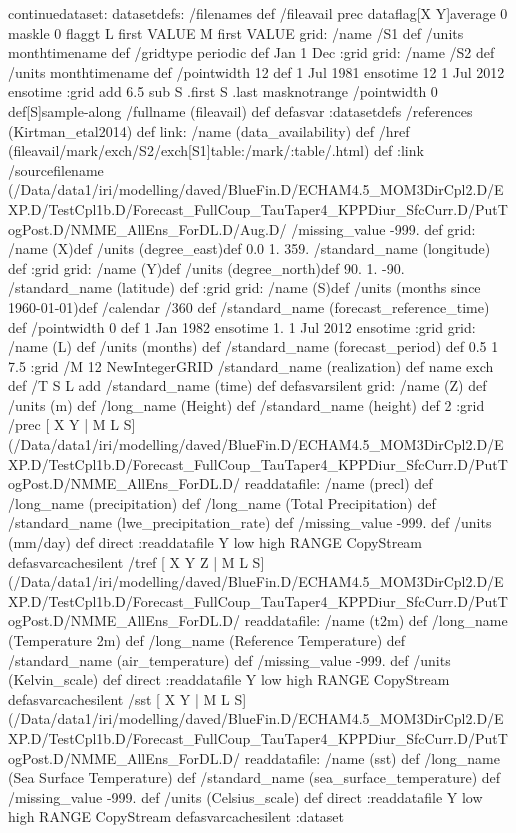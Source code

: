 \begin{ingrid}
continuedataset:
datasetdefs:
/filenames {
} def
/fileavail {
prec dataflag[X Y]average 0 maskle 0 flaggt L first VALUE M first VALUE grid: /name /S1 def /units monthtimename def /gridtype periodic def Jan 1 Dec :grid grid: /name /S2 def /units monthtimename def /pointwidth 12 def 1 Jul 1981 ensotime 12 1 Jul 2012 ensotime :grid add 6.5 sub S .first S .last masknotrange /pointwidth 0 def[S]sample-along /fullname (fileavail) def
} defasvar
:datasetdefs
/references (Kirtman_etal2014) def
link:
/name (data_availability) def
/href (fileavail/mark/exch/S2/exch[S1]table:/mark/:table/.html) def 
:link
 /sourcefilename (/Data/data1/iri/modelling/daved/BlueFin.D/ECHAM4.5_MOM3DirCpl2.D/EXP.D/TestCpl1b.D/Forecast_FullCoup_TauTaper4_KPPDiur_SfcCurr.D/PutTogPost.D/NMME_AllEns_ForDL.D/Aug.D/%
 /missing_value -999. def
grid:
/name (X)def
/units (degree_east)def
 0.0 1. 359.
/standard_name (longitude) def
:grid
grid:
/name (Y)def
/units (degree_north)def
 90. 1. -90.
/standard_name (latitude) def
:grid
grid:
/name (S)def
/units (months since 1960-01-01)def
/calendar /360 def
/standard_name (forecast_reference_time) def
/pointwidth 0 def
1 Jan 1982 ensotime
1. 
1 Jul 2012 ensotime %
:grid
grid:
/name (L) def
/units (months) def
/standard_name (forecast_period) def
0.5 1 7.5
:grid
/M 12 NewIntegerGRID
/standard_name (realization) def
 name exch def
/T { S L add
/standard_name (time) def } defasvarsilent
grid:
/name (Z) def
/units (m) def
/long_name (Height) def
/standard_name (height) def
2 :grid
 /prec{
[ X Y | M L S] 
(/Data/data1/iri/modelling/daved/BlueFin.D/ECHAM4.5_MOM3DirCpl2.D/EXP.D/TestCpl1b.D/Forecast_FullCoup_TauTaper4_KPPDiur_SfcCurr.D/PutTogPost.D/NMME_AllEns_ForDL.D/%
readdatafile:
/name (precl) def
 /long_name (precipitation) def
/long_name (Total Precipitation) def
/standard_name (lwe_precipitation_rate) def
 /missing_value -999. def
/units (mm/day) def
 direct :readdatafile
Y low high RANGE
CopyStream
}defasvarcachesilent
 /tref{
[ X Y Z | M L S] 
(/Data/data1/iri/modelling/daved/BlueFin.D/ECHAM4.5_MOM3DirCpl2.D/EXP.D/TestCpl1b.D/Forecast_FullCoup_TauTaper4_KPPDiur_SfcCurr.D/PutTogPost.D/NMME_AllEns_ForDL.D/%
readdatafile:
/name (t2m) def
 /long_name (Temperature 2m) def
/long_name (Reference Temperature) def
/standard_name (air_temperature) def
 /missing_value -999. def
/units (Kelvin_scale) def
 direct :readdatafile
Y low high RANGE
CopyStream
}defasvarcachesilent
 /sst{
[ X Y | M L S] 
(/Data/data1/iri/modelling/daved/BlueFin.D/ECHAM4.5_MOM3DirCpl2.D/EXP.D/TestCpl1b.D/Forecast_FullCoup_TauTaper4_KPPDiur_SfcCurr.D/PutTogPost.D/NMME_AllEns_ForDL.D/%
readdatafile:
/name (sst) def
 /long_name (Sea Surface Temperature) def
/standard_name (sea_surface_temperature) def
 /missing_value -999. def
/units (Celsius_scale) def
 direct :readdatafile
Y low high RANGE
CopyStream
}defasvarcachesilent
:dataset
\end{ingrid}
